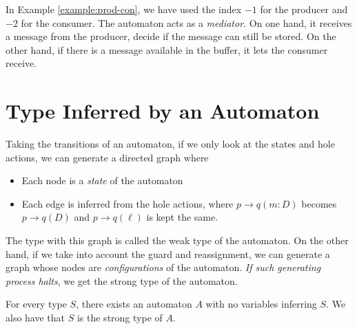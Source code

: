 In Example \ref{example:prod-con}, we have used the index $-1$ for the producer and $-2$ for the consumer. The automaton acts as a \textit{mediator}. On one hand, it receives a message from the producer, decide if the message can still be stored. On the other hand, if there is a message available in the buffer, it lets the consumer receive.


\section{Type Inferred by an Automaton}
Taking the transitions of an automaton, if we only look at the states and hole actions, we can generate a directed graph where
\begin{itemize}
  \item Each node is a \textit{state} of the automaton
  \item Each edge is inferred from the hole actions, where $p\to q(m : D)$ becomes $p\to q(D)$ and $p\to q(\ell)$ is kept the same.
\end{itemize}

The type with this graph is called the weak type of the automaton. On the other hand, if we take into account the guard and reassignment, we can generate a graph whose nodes are \textit{configurations} of the automaton. \textit{If such generating process halts}, we get the strong type of the automaton.

\begin{proposition}
  For every type $S$, there exists an automaton $A$ with no variables inferring $S$. We also have that $S$ is the strong type of $A$.
\end{proposition}

